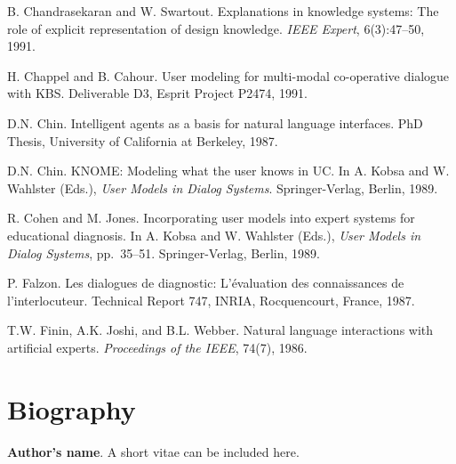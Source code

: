 \documentclass{river-journal}
\begin{document}
\begin{thebibliography}{10}
B. Chandrasekaran and W. Swartout.
 Explanations in knowledge systems: The role of explicit
  representation of design knowledge.
 {\em IEEE Expert}, 6(3):47--50, 1991.

H. Chappel and B. Cahour.
 User modeling for multi-modal co-operative dialogue with KBS.
 Deliverable D3, Esprit Project P2474, 1991.

D.N. Chin.
 {Intelligent agents as a basis for natural language interfaces}.
 PhD Thesis, University of California at Berkeley, 1987.

D.N. Chin.
 {KNOME}: {M}odeling what the user knows in {UC}.
 In A. Kobsa and W. Wahlster (Eds.), {\em User Models in
  Dialog Systems}. Springer-Verlag, Berlin, 1989.

R. Cohen and M. Jones.
 Incorporating user models into expert systems for educational
  diagnosis.
 In A. Kobsa and W. Wahlster (Eds.), {\em User Models in
  Dialog Systems}, pp.~35--51. Springer-Verlag,   Berlin, 1989.

P. Falzon.
 Les dialogues de diagnostic: L'{\'e}valuation des connaissances de
  l'interlocuteur.
 Technical Report 747, INRIA, Rocquencourt, France, 1987.

T.W. Finin, A.K. Joshi, and B.L. Webber.
 Natural language interactions with artificial experts.
 {\em Proceedings of the IEEE}, 74(7), 1986.

\end{thebibliography}

\section*{Biography}


\medskip
\noindent
{\bf Author's name}. A short vitae can be included here.
\end{document}
